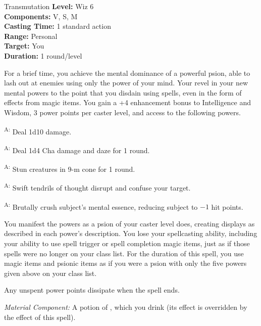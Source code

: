 {Transmutation}
{
	\textbf{Level:} Wiz 6\\
	\textbf{Components:} V, S, M\\
	\textbf{Casting Time:} 1 standard action\\
	\textbf{Range:} Personal\\
	\textbf{Target:} You\\
	\textbf{Duration:} 1 round/level\\
}
{
	For a brief time, you achieve the mental dominance of a powerful psion, able to lash out at enemies using only the power of your mind. Your revel in your new mental powers to the point that you disdain using spells, even in the form of effects from magic items. You gain a +4 enhancement bonus to Intelligence and Wisdom, 3 power points per caster level, and access to the following powers.

	\begin{itemize*}
		\item {}\textsuperscript{A:} Deal 1d10 damage.
		\item {}\textsuperscript{A:} Deal 1d4 Cha damage and daze for 1 round.
		\item {}\textsuperscript{A:} Stun creatures in 9-m cone for 1 round.
		\item {}\textsuperscript{A:} Swift tendrils of thought disrupt and confuse your target.
		\item {}\textsuperscript{A:} Brutally crush subject's mental essence, reducing subject to $-1$ hit points.
	\end{itemize*}

	You manifest the powers as a psion of your caster level does, creating displays as described in each power's description. You lose your spellcasting ability, including your ability to use spell trigger or spell completion magic items, just as if those spells were no longer on your class list. For the duration of this spell, you use magic items and psionic items as if you were a psion with only the five powers given above on your class list.

	Any unspent power points dissipate when the spell ends.

	\textit{Material Component:} A potion of , which you drink (its effect is overridden by the effect of this spell).
}
